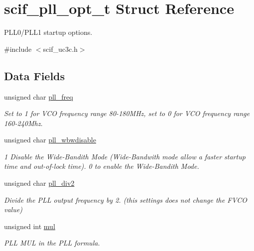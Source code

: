 \hypertarget{structscif__pll__opt__t}{
\section{scif\-\_\-pll\-\_\-opt\-\_\-t \-Struct \-Reference}
\label{structscif__pll__opt__t}
}


\-P\-L\-L0/\-P\-L\-L1 startup options.  




{\ttfamily \#include $<$scif\-\_\-uc3c.\-h$>$}

\subsection*{\-Data \-Fields}
\begin{DoxyCompactItemize}
\item 
unsigned char \hyperlink{structscif__pll__opt__t_ae397f441f9093a691a6e74fa777dd939}{pll\-\_\-freq}
\begin{DoxyCompactList}\small\item\em \-Set to 1 for \-V\-C\-O frequency range 80-\/180\-M\-Hz, set to 0 for \-V\-C\-O frequency range 160-\/240\-Mhz. \end{DoxyCompactList}\item 
unsigned char \hyperlink{structscif__pll__opt__t_a4740e279139f74bfc8e5b0a03877afea}{pll\-\_\-wbwdisable}
\begin{DoxyCompactList}\small\item\em 1 \-Disable the \-Wide-\/\-Bandith \-Mode (\-Wide-\/\-Bandwith mode allow a faster startup time and out-\/of-\/lock time). 0 to enable the \-Wide-\/\-Bandith \-Mode. \end{DoxyCompactList}\item 
unsigned char \hyperlink{structscif__pll__opt__t_af1afe250ff51e752c3edf06da9f25aad}{pll\-\_\-div2}
\begin{DoxyCompactList}\small\item\em \-Divide the \-P\-L\-L output frequency by 2. (this settings does not change the \-F\-V\-C\-O value) \end{DoxyCompactList}\item 
unsigned int \hyperlink{structscif__pll__opt__t_aae5047440f34de93ea589e39e4ce94da}{mul}
\begin{DoxyCompactList}\small\item\em \-P\-L\-L \-M\-U\-L in the \-P\-L\-L formula. \end{DoxyCompactList}\item 

\end{DoxyCompactItemize}

